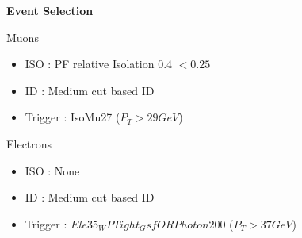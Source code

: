 \documentclass{beamer}
\begin{document}
\begin{frame}{\textbf{Event Selection}}

\begin{block}{Muons}
\begin{itemize}
  \item ISO     : PF relative Isolation 0.4 $< 0.25$ 
  \item ID      : Medium cut based ID 
  \item Trigger : IsoMu27 ($P_T > 29 GeV$)
\end{itemize}

\end{block}

\begin{block}{Electrons}
\begin{itemize}
  \item ISO     : None
  \item ID      : Medium cut based ID 
  \item Trigger : $Ele35_WPTight_Gsf OR Photon200$  ($P_T > 37 GeV$)
\end{itemize}

\end{block}



\end{frame}







\end{document}
